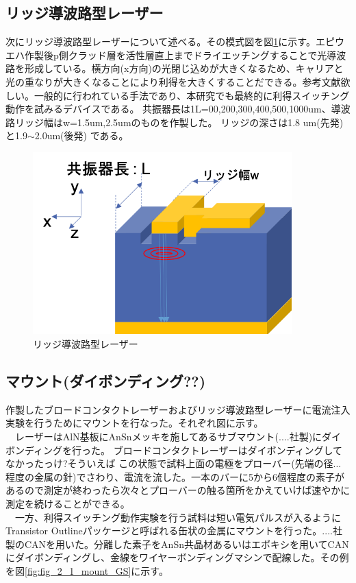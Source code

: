 \subsection{リッジ導波路型レーザー}%
次にリッジ導波路型レーザーについて述べる。その模式図を図\ref{fig_2_1_ridge}に示す。エピウエハ作製後p側クラッド層を活性層直上までドライエッチングすることで光導波路を形成している。横方向(x方向)の光閉じ込めが大きくなるため、キャリアと光の重なりが大きくなることにより利得を大きくすることだできる。参考文献欲しい。一般的に行われている手法であり、本研究でも最終的に利得スイッチング動作を試みるデバイスである。
共振器長は1L=00,200,300,400,500,1000um、導波路リッジ幅はw=1.5um,2.5umのものを作製した。
リッジの深さは1.8 um(先発)と1.9$\sim$2.0um(後発)
である。
\begin{figure}[t]
	\centering
	\includegraphics[width=10cm]{figure/fig_2_1_ridge.png}
	\caption{リッジ導波路型レーザー}
	\label{fig_2_1_ridge}
\end{figure}
\clearpage
\subsection{マウント(ダイボンディング??)}%
作製したブロードコンタクトレーザーおよびリッジ導波路型レーザーに電流注入実験を行うためにマウントを行なった。それぞれ図に示す。\\
　レーザーはAlN基板にAnSnメッキを施してあるサブマウント(....社製)にダイボンディングを行った。
ブロードコンタクトレーザーはダイボンディングしてなかったっけ?そういえば
この状態で試料上面の電極をプローバー(先端の径...程度の金属の針)でさわり、電流を流した。一本のバーに5から6個程度の素子があるので測定が終わったら次々とプローバーの触る箇所をかえていけば速やかに測定を続けることができる。\\
　一方、利得スイッチング動作実験を行う試料は短い電気パルスが入るようにTransistor Outlineパッケージと呼ばれる缶状の金属にマウントを行った。....社製のCANを用いた。分離した素子をAnSn共晶材あるいはエポキシを用いてCANにダイボンディングし、金線をワイヤーボンディングマシンで配線した。その例を図\ref{fig:fig_2_1_mount_GS}に示す。


